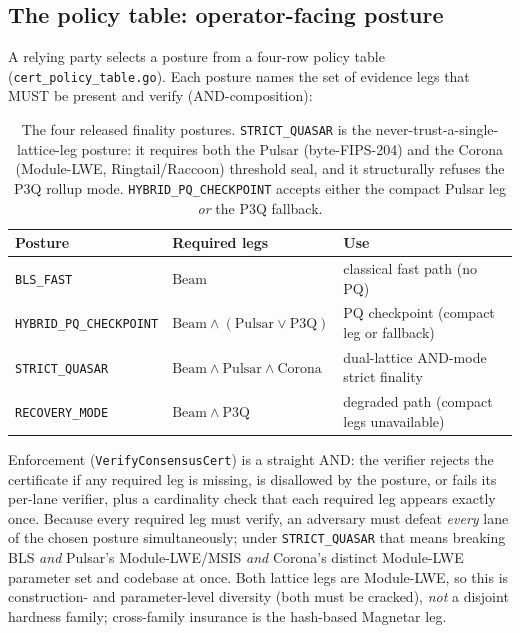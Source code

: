\subsection{The policy table: operator-facing posture}
\label{sec:compact-cert:policy}

A relying party selects a posture from a four-row policy table
(\texttt{cert\_policy\_table.go}). Each posture names the set of evidence
legs that MUST be present and verify (AND-composition):

\begin{table}[ht]
\centering
\small
\begin{tabular}{@{}lll@{}}
\toprule
\textbf{Posture} & \textbf{Required legs} & \textbf{Use} \\
\midrule
\texttt{BLS\_FAST}             & $\mathrm{Beam}$
  & classical fast path (no PQ) \\
\texttt{HYBRID\_PQ\_CHECKPOINT} & $\mathrm{Beam} \wedge (\mathrm{Pulsar} \vee \mathrm{P3Q})$
  & PQ checkpoint (compact leg or fallback) \\
\texttt{STRICT\_QUASAR}        & $\mathrm{Beam} \wedge \mathrm{Pulsar} \wedge \mathrm{Corona}$
  & dual-lattice AND-mode strict finality \\
\texttt{RECOVERY\_MODE}        & $\mathrm{Beam} \wedge \mathrm{P3Q}$
  & degraded path (compact legs unavailable) \\
\bottomrule
\end{tabular}
\caption{The four released finality postures. \texttt{STRICT\_QUASAR} is the
never-trust-a-single-lattice-leg posture: it requires both the Pulsar
(byte-FIPS-204) and the Corona (Module-LWE, Ringtail/Raccoon) threshold
seal, and it structurally refuses the P3Q rollup mode. \texttt{HYBRID\_PQ\_CHECKPOINT}
accepts either the compact Pulsar leg \emph{or} the P3Q fallback.}
\label{tab:policy}
\end{table}

Enforcement (\texttt{VerifyConsensusCert}) is a straight AND: the verifier
rejects the certificate if any required leg is missing, is disallowed by the
posture, or fails its per-lane verifier, plus a cardinality check that each
required leg appears exactly once. Because every required leg must verify,
an adversary must defeat \emph{every} lane of the chosen posture
simultaneously; under \texttt{STRICT\_QUASAR} that means breaking BLS
\emph{and} Pulsar's Module-LWE/MSIS \emph{and} Corona's distinct Module-LWE
parameter set and codebase at once. Both lattice legs are Module-LWE, so
this is construction- and parameter-level diversity (both must be cracked),
\emph{not} a disjoint hardness family; cross-family insurance is the
hash-based Magnetar leg.

